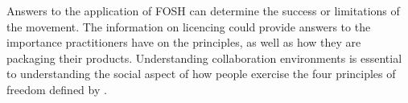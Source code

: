 \documentclass[final-report.tex]{subfiles}
\begin{document}
Answers to the application of FOSH can determine the success or limitations of the movement.
The information on licencing could provide answers to the importance practitioners have on the principles, as well as how they are packaging their products. 
Understanding collaboration environments is essential to understanding the social aspect of how people exercise the four principles of freedom defined by \cite{b0_stallman}.

\end{document}
